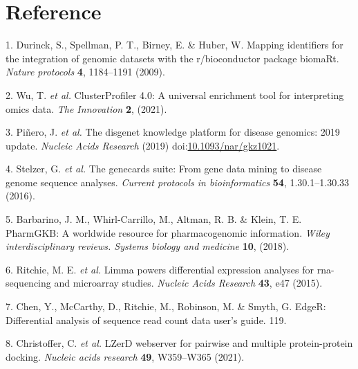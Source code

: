 \documentclass[
]{article}
\newenvironment{cslreferences}%
  {}%
  {\par}
\begin{document}
\hypertarget{bibliography}{%
\section*{Reference}\label{bibliography}}

\hypertarget{refs}{}
\begin{cslreferences}
\leavevmode\hypertarget{ref-MappingIdentifDurinc2009}{}%
1. Durinck, S., Spellman, P. T., Birney, E. \& Huber, W. Mapping identifiers for the integration of genomic datasets with the r/bioconductor package biomaRt. \emph{Nature protocols} \textbf{4}, 1184--1191 (2009).

\leavevmode\hypertarget{ref-ClusterprofilerWuTi2021}{}%
2. Wu, T. \emph{et al.} ClusterProfiler 4.0: A universal enrichment tool for interpreting omics data. \emph{The Innovation} \textbf{2}, (2021).

\leavevmode\hypertarget{ref-TheDisgenetKnPinero2019}{}%
3. Piñero, J. \emph{et al.} The disgenet knowledge platform for disease genomics: 2019 update. \emph{Nucleic Acids Research} (2019) doi:\href{https://doi.org/10.1093/nar/gkz1021}{10.1093/nar/gkz1021}.

\leavevmode\hypertarget{ref-TheGenecardsSStelze2016}{}%
4. Stelzer, G. \emph{et al.} The genecards suite: From gene data mining to disease genome sequence analyses. \emph{Current protocols in bioinformatics} \textbf{54}, 1.30.1--1.30.33 (2016).

\leavevmode\hypertarget{ref-PharmgkbAWorBarbar2018}{}%
5. Barbarino, J. M., Whirl-Carrillo, M., Altman, R. B. \& Klein, T. E. PharmGKB: A worldwide resource for pharmacogenomic information. \emph{Wiley interdisciplinary reviews. Systems biology and medicine} \textbf{10}, (2018).

\leavevmode\hypertarget{ref-LimmaPowersDiRitchi2015}{}%
6. Ritchie, M. E. \emph{et al.} Limma powers differential expression analyses for rna-sequencing and microarray studies. \emph{Nucleic Acids Research} \textbf{43}, e47 (2015).

\leavevmode\hypertarget{ref-EdgerDifferenChen}{}%
7. Chen, Y., McCarthy, D., Ritchie, M., Robinson, M. \& Smyth, G. EdgeR: Differential analysis of sequence read count data user's guide. 119.

\leavevmode\hypertarget{ref-LzerdWebserverChrist2021}{}%
8. Christoffer, C. \emph{et al.} LZerD webserver for pairwise and multiple protein-protein docking. \emph{Nucleic acids research} \textbf{49}, W359--W365 (2021).


\end{cslreferences}
\end{document}
